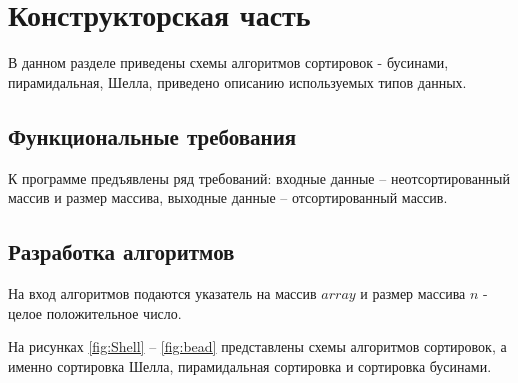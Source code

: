 \chapter{Конструкторская часть}

В данном разделе приведены схемы алгоритмов сортировок - бусинами, пирамидальная, Шелла, приведено описанию используемых типов данных.

\section{Функциональные требования}

К программе предъявлены ряд требований: входные данные -- неотсортированный массив и размер массива, выходные данные -- отсортированный массив.

\section{Разработка алгоритмов}

На вход алгоритмов подаются указатель на массив $array$ и размер массива $n$ - целое положительное число.

На рисунках \ref{fig:Shell} -- \ref{fig:bead} представлены схемы алгоритмов сортировок, а именно сортировка Шелла, пирамидальная сортировка и сортировка бусинами.

